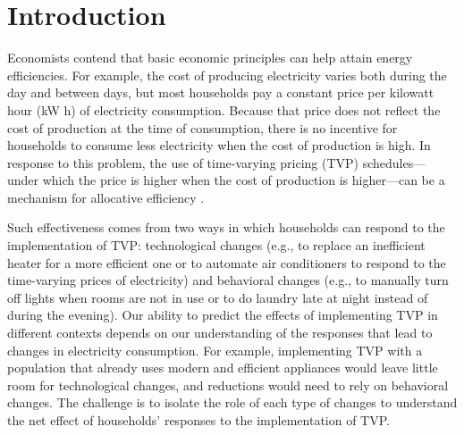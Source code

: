 \documentclass[12pt]{article}
\begin{document}



% 


\section{Introduction}

Economists contend that basic economic principles can help attain energy efficiencies. For example, the cost of producing electricity varies both during the day and between days, but most households pay a constant price per kilowatt hour (kW h) of electricity consumption. Because that price does not reflect the cost of production at the time of consumption, there is no incentive for households to consume less electricity when the cost of production is high. In response to this problem, the use of time-varying pricing (TVP) schedules--- under which the price is higher when the cost of production is higher---can be a mechanism for allocative efficiency \citep{allcottRethinkingRealtimeElectricity2011,wolakResidentialCustomersRespond2011,jessoeUnderstandingRolePrice2014}.

Such effectiveness comes from two ways in which households can respond to the implementation of TVP: technological changes (e.g., to replace an inefficient heater for a more efficient one or to automate air conditioners to respond to the time-varying prices of electricity) and behavioral changes (e.g., to manually turn off lights when rooms are not in use or to do laundry late at night instead of during the evening). Our ability to predict the effects of implementing TVP in different contexts depends on our understanding of the responses that lead to changes in electricity consumption. For example, implementing TVP with a population that already uses modern and efficient appliances would leave little room for technological changes, and reductions would need to rely on behavioral changes. The challenge is to isolate the role of each type of changes to understand the net effect of households’ responses to the implementation of TVP.
\end{document}
